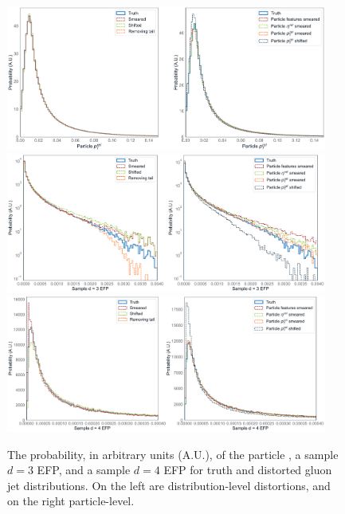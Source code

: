 \begin{figure}[htpb]
    \includegraphics[width=0.94\textwidth]{figures/04-ML4Sim/evaluating/jet_partpt_dists.pdf}
    \includegraphics[width=0.94\textwidth]{figures/04-ML4Sim/evaluating/jet_efp12_dists.pdf}
    \includegraphics[width=0.94\textwidth]{figures/04-ML4Sim/evaluating/jet_efp25_dists.pdf}
    \caption{The probability, in arbitrary units (A.U.), of the particle \ptrel, a sample $d=3$ EFP, and a sample $d=4$ EFP for truth and distorted gluon jet distributions.
    On the left are distribution-level distortions, and on the right particle-level.}
    \label{fig:04_evaluating_jet_dists_app}
\end{figure}
